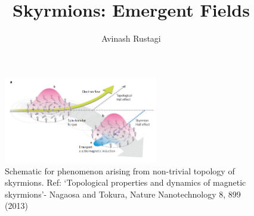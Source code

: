 \documentclass[aps,prb,onecolumn,notitlepage,showpacs,floatfix,superscriptaddress]{revtex4-1}
\begin{document}
\title{Skyrmions: Emergent Fields}

\author{Avinash Rustagi}
%

\maketitle
%
\begin{figure}[hbtp]
\centering
\includegraphics[width=0.6\textwidth]{Schematic.png}
\caption{Schematic for phenomenon arising from non-trivial topology of skyrmions. Ref: `Topological properties and dynamics of magnetic skyrmions'- Nagaosa and Tokura, Nature Nanotechnology 8, 899 (2013)}
\end{figure}
\end{document}
